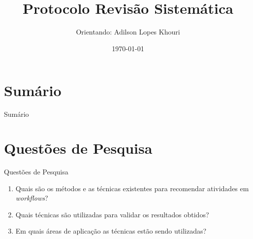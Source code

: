 \documentclass[compress]{beamer}
\begin{document}
\title{Protocolo Revisão Sistemática}
\author{Orientando: Adilson Lopes Khouri}
\date{\today}


\begin{frame}
\titlepage
\end{frame}


\section*{Sumário}
\begin{frame}{Sumário}
\tableofcontents
\end{frame}

\section{Questões de Pesquisa}
\begin{frame}{}

\begin{block}{Questões de Pesquisa}
\begin{enumerate}
\item Quais são os métodos e as técnicas existentes para recomendar atividades em \emph{workf\mbox{}lows}?
\item Quais técnicas são utilizadas para validar os resultados obtidos?
\item Em quais áreas de aplicação as técnicas estão sendo utilizadas?
\end{enumerate}
\end{block}
\end{frame}
\end{document}

